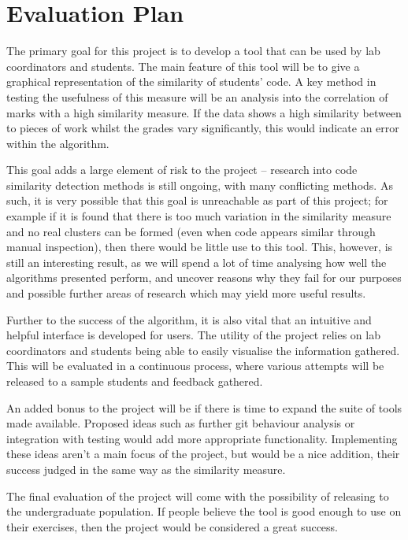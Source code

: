 
\chapter{Evaluation Plan} %

\label{EvaluationPlan} %


The primary goal for this project is to develop a tool that can be used by lab
coordinators and students. The main feature of this tool will be to give a
graphical representation of the similarity of students' code. A key method in
testing the usefulness of this measure will be an analysis into the correlation
of marks with a high similarity measure. If the data shows a high similarity
between to pieces of work whilst the grades vary significantly, this would indicate
an error within the algorithm. 

This goal adds a large element of risk to the project -- research into code
similarity detection methods is still ongoing, with many conflicting methods. As
such, it is very possible that this goal is unreachable as part of this project;
for example if it is found that there is too much variation in the similarity
measure and no real clusters can be formed (even when code appears similar through
manual inspection), then there would be little use to this tool. This, however, is
still an interesting result, as we will spend a lot of time analysing how well
the algorithms presented perform, and uncover reasons why they fail for our
purposes and possible further areas of research which may yield more useful results.

Further to the success of the algorithm, it is also vital that an intuitive and
helpful interface is developed for users. The utility of the project relies on
lab coordinators and students being able to easily visualise the information
gathered. This will be evaluated in a continuous process, where various attempts
will be released to a sample students and feedback gathered. 

An added bonus to the project will be if there is time to expand the suite of 
tools made available. Proposed ideas such as further git behaviour analysis
or integration with testing would add more appropriate functionality. Implementing
these ideas aren't a main focus of the project, but would be a nice addition,
their success judged in the same way as the similarity measure.

The final evaluation of the
project will come with the possibility of releasing to the undergraduate population.
If people believe the tool is good enough to use on their exercises, then the project
would be considered a great success.